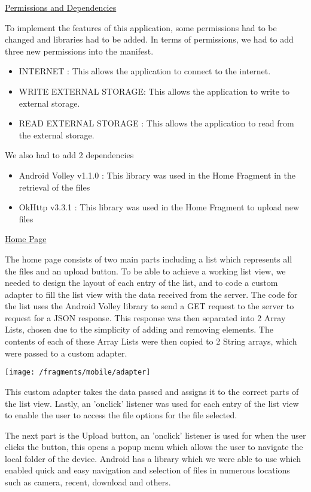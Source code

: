 \documentclass{article}
\begin{document}
\underline{Permissions and Dependencies}

To implement the features of this application, some permissions had to be changed and libraries had to be added. In terms of permissions, we had to add three new permissions into the manifest. 

\begin{itemize}
\item INTERNET : This allows the application to connect to the internet.
\item WRITE EXTERNAL STORAGE: This allows the application to write to external storage.
\item READ EXTERNAL STORAGE : This allows the application to read from the external storage.
\end{itemize}

We also had to add 2 dependencies 

\begin{itemize}
\item Android Volley v1.1.0 : This library was used in the Home Fragment in the retrieval of the files
\item OkHttp v3.3.1 : This library was used in the Home Fragment to upload new files
\end{itemize}

\underline{Home Page}

The home page consists of two main parts including a list which represents all the files and an upload button. To be able to achieve a working list view, we needed to design the layout of each entry of the list, and to code a custom adapter to fill the list view with the data received from the server. The code for the list uses the Android Volley library to send a GET request to the server to request for a JSON response. This response was then separated into 2 Array Lists, chosen due to the simplicity of adding and removing elements. The contents of each of these Array Lists were then copied to 2 String arrays, which were passed to a custom adapter. 

\texttt{[image: /fragments/mobile/adapter]}

This custom adapter takes the data passed and assigns it to the correct parts of the list view. Lastly, an 'onclick' listener was used for each entry of the list view to enable the user to access the file options for the file selected. 

The next part is the Upload button, an 'onclick' listener is used for when the user clicks the button, this opens a popup menu which allows the user to navigate the local folder of the device. Android has a library which we were able to use which enabled quick and easy navigation and selection of files in numerous locations such as camera, recent, download and others. 
\end{document}
